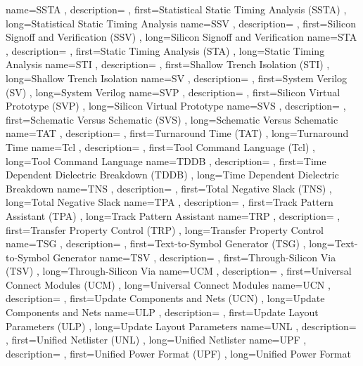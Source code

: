 { name={SSTA}
, description={}
, first={Statistical Static Timing Analysis (SSTA)}
, long={Statistical Static Timing Analysis}
}
{ name={SSV}
, description={}
, first={Silicon Signoff and Verification (SSV)}
, long={Silicon Signoff and Verification}
}
{ name={STA}
, description={}
, first={Static Timing Analysis (STA)}
, long={Static Timing Analysis}
}
{ name={STI}
, description={}
, first={Shallow Trench Isolation (STI)}
, long={Shallow Trench Isolation}
}
{ name={SV}
, description={}
, first={System Verilog (SV)}
, long={System Verilog}
}
{ name={SVP}
, description={}
, first={Silicon Virtual Prototype (SVP)}
, long={Silicon Virtual Prototype}
}
{ name={SVS}
, description={}
, first={Schematic Versus Schematic (SVS)}
, long={Schematic Versus Schematic}
}
{ name={TAT}
, description={}
, first={Turnaround Time (TAT)}
, long={Turnaround Time}
}
{ name={Tcl}
, description={}
, first={Tool Command Language (Tcl)}
, long={Tool Command Language}
}
{ name={TDDB}
, description={}
, first={Time Dependent Dielectric Breakdown (TDDB)}
, long={Time Dependent Dielectric Breakdown}
}
{ name={TNS}
, description={}
, first={Total Negative Slack (TNS)}
, long={Total Negative Slack}
}
{ name={TPA}
, description={}
, first={Track Pattern Assistant (TPA)}
, long={Track Pattern Assistant}
}
{ name={TRP}
, description={}
, first={Transfer Property Control (TRP)}
, long={Transfer Property Control}
}
{ name={TSG}
, description={}
, first={Text-to-Symbol Generator (TSG)}
, long={Text-to-Symbol Generator}
}
{ name={TSV}
, description={}
, first={Through-Silicon Via (TSV)}
, long={Through-Silicon Via}
}
{ name={UCM}
, description={}
, first={Universal Connect Modules (UCM)}
, long={Universal Connect Modules}
}
{ name={UCN}
, description={}
, first={Update Components and Nets (UCN)}
, long={Update Components and Nets}
}
{ name={ULP}
, description={}
, first={Update Layout Parameters (ULP)}
, long={Update Layout Parameters}
}
{ name={UNL}
, description={}
, first={Unified Netlister (UNL)}
, long={Unified Netlister}
}
{ name={UPF}
, description={}
, first={Unified Power Format (UPF)}
, long={Unified Power Format}
}
